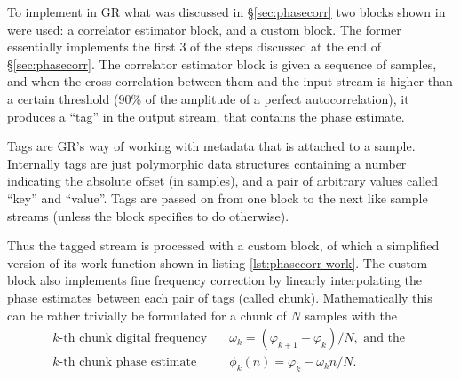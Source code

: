 To implement in GR what was discussed in \S\ref{sec:phasecorr} two blocks shown in  were used: a correlator estimator block, and a custom block. The former essentially implements the first 3 of the steps discussed at the end of \S\ref{sec:phasecorr}. The correlator estimator block is given a sequence of samples, and when the cross correlation between them and the input stream is higher than a certain threshold (90\% of the amplitude of a perfect autocorrelation), it produces a ``tag'' in the output stream, that contains the phase estimate.

Tags are GR's way of working with metadata that is attached to a sample. Internally tags are just polymorphic data structures containing a number indicating the absolute offset (in samples), and a pair of arbitrary values called ``key'' and ``value''. Tags are passed on from one block to the next like sample streams (unless the block specifies to do otherwise).

Thus the tagged stream is processed with a custom block, of which a simplified version of its work function shown in listing \ref{lst:phasecorr-work}. The custom block also implements fine frequency correction by linearly interpolating the phase estimates between each pair of tags (called chunk). Mathematically this can be rather trivially be formulated for a chunk of \(N\) samples with the
\begin{subequations}
	\begin{align}
		k\text{-th chunk digital frequency} \quad  & \omega_k = (\varphi_{k+1} - \varphi_k) / N, \text{ and the }\\
		k\text{-th chunk phase estimate} \quad & \phi_k(n) = \varphi_k - \omega_k n/N.
	\end{align}
\end{subequations}


